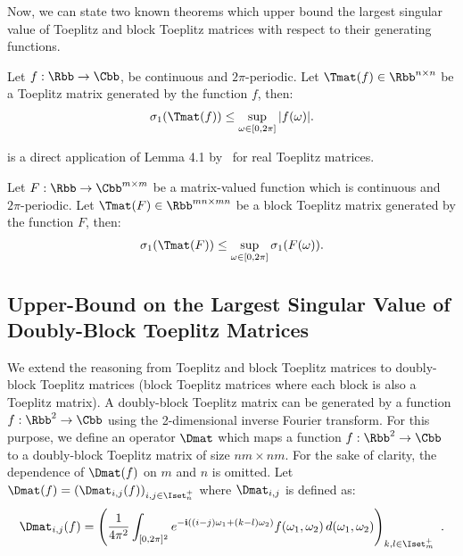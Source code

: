 Now, we can state two known theorems which upper bound the largest singular value of Toeplitz and block Toeplitz matrices with respect to their generating functions.
\begin{theorem} \label{theorem:teoplitz_sup_singular}
  Let $f: \Rbb \rightarrow \Cbb$, be continuous and $2\pi$-periodic. Let $\Tmat(f) \in \Rbb^{n \times n}$ be a Toeplitz matrix generated by the function $f$, then:
  \begin{align}
    \sigma_1 \left( \Tmat(f) \right) \leq \sup_{\omega \in [0, 2\pi]} |f(\omega)|.
  \end{align}
  \removespace
\end{theorem}
\noindent
{} is a direct application of  Lemma 4.1 by~\citet{gray2006toeplitz} for real Toeplitz matrices. 

\begin{theorem} \label{theorem:block_teoplitz_sup_singular}
  Let $F: \Rbb \rightarrow \Cbb^{m \times m}$ be a matrix-valued function which is continuous and $2 \pi$-periodic.
  Let $\Tmat(F) \in \Rbb^{mn \times mn}$ be a block Toeplitz matrix generated by the function $F$, then:
  \begin{align}
    \sigma_1 \left( \Tmat(F) \right) \leq \sup_{\omega \in [0, 2\pi]} \sigma_1 \left( F\left( \omega \right) \right) .
  \end{align}
  \removespace
\end{theorem}





\subsection{Upper-Bound on the Largest Singular Value of Doubly-Block Toeplitz Matrices}
\label{subsection:ch5-bound_on_the_singular_value_of_doubly-block_toeplitz_matrices}

We extend the reasoning from Toeplitz and block Toeplitz matrices to doubly-block Toeplitz matrices (\ie block Toeplitz matrices where each block is also a Toeplitz matrix).
A doubly-block Toeplitz matrix can be generated by a function $f: \Rbb^2 \rightarrow \Cbb$ using the 2-dimensional inverse Fourier transform.
For this purpose, we define an operator $\Dmat$ which maps a function $f: \Rbb^2 \rightarrow \Cbb$ to a doubly-block Toeplitz matrix of size $nm \times nm$.
For the sake of clarity, the dependence of $\Dmat(f)$  on $m$ and $n$ is omitted.
Let $\Dmat(f) = \leftmat \Dmat_{i,j}(f)\rightmat_{i,j \in \Iset^+_n}$ where $\Dmat_{i,j}$ is defined as:
\begin{equation} \label{equation:doubly_block_toeplitz_operator}
  \Dmat_{i,j}(f) = \leftmat \frac{1}{4\pi^{2}} \int_{[0,2\pi]^{2}} e^{- \ci \left((i-j)\omega_{1}+(k-l)\omega_{2}\right)}f(\omega_{1},\omega_{2})\,d(\omega_{1},\omega_{2}) \rightmat_{k,l \in \Iset^+_m} \enspace.
\end{equation}


